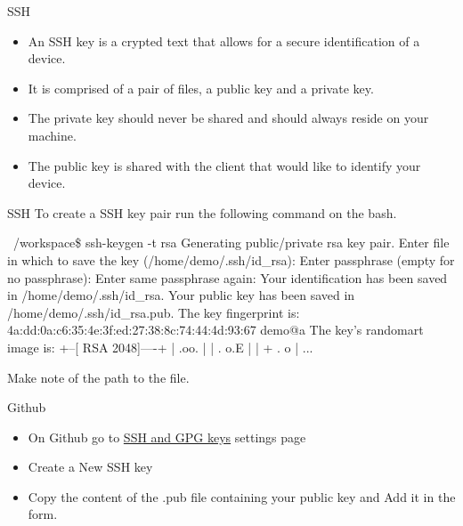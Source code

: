 \begin{frame}[fragile]{SSH}
\begin{itemize}
    \item An SSH key is a crypted text that allows for a secure identification of a device.
    \item It is comprised of a pair of files, a public key and a private key.
    \item The private key should never be shared and should always reside on your machine.
    \item The public key is shared with the client that would like to identify your device.
\end{itemize}
\end{frame}

\begin{frame}[fragile]{SSH\insertcontinuationtext}
    To create a SSH key pair run the following command on the bash.
    \begin{shellblock}
~/workspace\$ ssh-keygen -t rsa
Generating public/private rsa key pair.
Enter file in which to save the key (/home/demo/.ssh/id_rsa): 
Enter passphrase (empty for no passphrase): 
Enter same passphrase again: 
Your identification has been saved in /home/demo/.ssh/id_rsa.
Your public key has been saved in /home/demo/.ssh/id_rsa.pub.
The key fingerprint is:
4a:dd:0a:c6:35:4e:3f:ed:27:38:8c:74:44:4d:93:67 demo@a
The key's randomart image is:
+--[ RSA 2048]----+
|          .oo.   |
|         .  o.E  |
|        + .  o   |
...
    \end{shellblock}
Make note of the path to the  file.
\end{frame}

\begin{frame}[fragile]{Github \insertcontinuationtext}
    \begin{itemize}
        \item On Github go to \alert{\href{https://github.com/settings/keys}{SSH and GPG keys}} settings page
        \item Create a New SSH key
        \item Copy the content of the .pub file containing your public key and Add it in the form.
    \end{itemize}
\end{frame}

